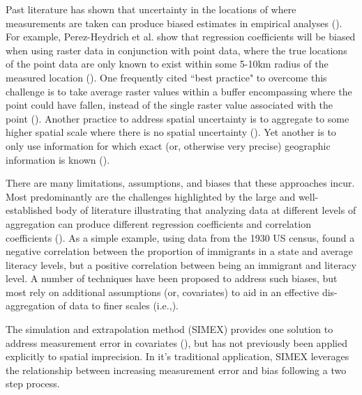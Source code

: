 Past literature has shown that uncertainty in the locations of where measurements are taken can produce biased estimates in empirical analyses (\cite{perez-heydrich_guidelines_2013,rettie_overcoming_1999}). 
For example, Perez-Heydrich et al. show that regression coefficients will be biased when using raster data in conjunction with point data, where the true locations of the point data are only known to exist within some 5-10km radius of the measured location (\cite{perez-heydrich_guidelines_2013}). 
One frequently cited ``best practice" to overcome this challenge is to take average raster values within a buffer encompassing where the point could have fallen, instead of the single raster value associated with the point (\cite{perez-heydrich_guidelines_2013, rettie_overcoming_1999}). 
Another practice to address spatial uncertainty is to aggregate to some higher spatial scale where there is no spatial uncertainty (\cite{perez-heydrich_guidelines_2013}). 
Yet another is to only use information for which exact (or, otherwise very precise) geographic information is known (\cite{runfola_migration_2016,dreher_aid_2015}).
\par
There are many limitations, assumptions, and biases that these approaches incur.
Most predominantly are the challenges highlighted by the large and well-established body of literature illustrating that analyzing data at different levels of aggregation can produce different regression coefficients and correlation coefficients (\cite{clark_effects_1976, selvin_durkheims_1958, gotway_combining_2002, gehlke_certain_1934, cramer_efficient_1964}). 
As a simple example, using data from the 1930 US census, \cite{robinson_ecological_2009} found a negative correlation between the proportion of immigrants in a state and average literacy levels, but a positive correlation between being an immigrant and literacy level. 
A number of techniques have been proposed to address such biases, but most rely on additional assumptions (or, covariates) to aid in an effective dis-aggregation of data to finer scales (i.e.,\cite{gotway_combining_2002, zhu_combined_2004,oloughlin_can_2000,wong_modifiable_2004}).
\par
The simulation and extrapolation method (SIMEX) provides one solution to address measurement error in covariates (\cite{wang_bias_1998,kuchenhoff_general_2006,li_functional_2003,cook_simulation-extrapolation_1994}), but has not previously been applied explicitly to spatial imprecision. 
In it's traditional application, SIMEX leverages the relationship between increasing measurement error and bias following a two step process. 
